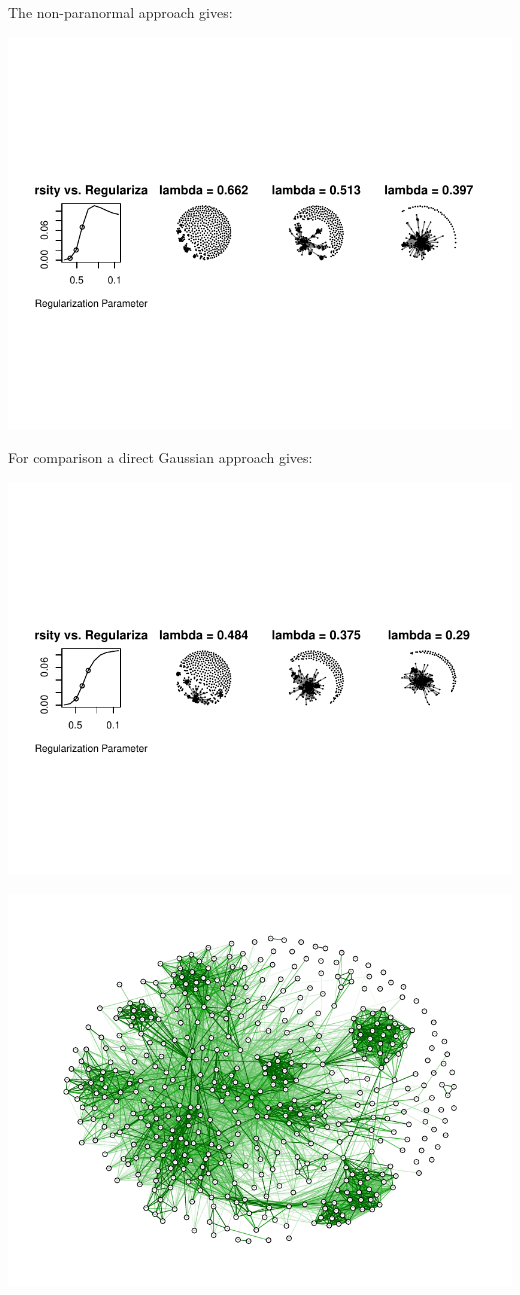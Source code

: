 \documentclass[11pt,handout,aspectratio=169,dvipsnames]{beamer}
\begin{document}
\begin{frame}{}
The non-paranormal approach gives:
\begin{center}
	\includegraphics{pics/huge_stocks1}	
\end{center}
For comparison a direct Gaussian approach gives:
\begin{center}
	\includegraphics{pics/huge_stocks1_gauss}	
\end{center}
\end{frame}

\begin{frame}{}
\begin{center}
	\includegraphics[scale=.8]{pics/huge_stocks2}	
\end{center}
\end{frame}
\end{document}
